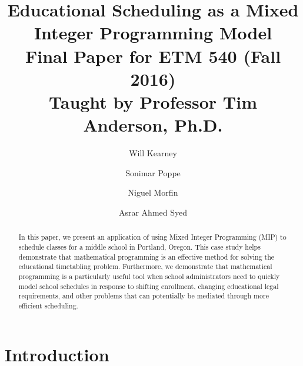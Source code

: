\documentclass[12pt]{article}
\begin{document}
\renewcommand\Authfont{\small}
\renewcommand\Affilfont{\itshape\footnotesize}
\title{
	{Educational Scheduling as a Mixed Integer Programming Model}\\
	\vspace{2cm}
	{\large Final Paper for ETM 540 (Fall 2016)}\\
	{\large Taught by Professor Tim Anderson, Ph.D.}\\
	\vspace{2cm}
}



\author[1,2]{Will Kearney}
\author[1,2]{Sonimar Poppe}
\author[2]{Niguel Morfin}
\author[2]{Asrar Ahmed Syed}

\maketitle
\newpage

\begin{abstract}
In this paper, we present an application of using Mixed Integer Programming (MIP) to schedule classes for a middle school in Portland, Oregon. This case study helps demonstrate that mathematical programming is an effective method for solving the educational timetabling problem. Furthermore, we demonstrate that mathematical programming is a particularly useful tool when school administrators need to quickly model school schedules in response to shifting enrollment, changing educational legal requirements, and other problems that can potentially be mediated through more efficient scheduling.
\end{abstract}

\newpage

\tableofcontents
\newpage


\section{Introduction}
\end{document}
